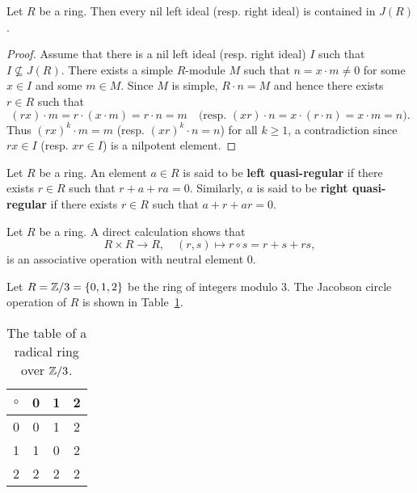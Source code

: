 \begin{proposition}
	\label{pro:nilJ}
	Let $R$ be a ring. Then every nil left ideal (resp. right ideal) is contained in $J(R)$.
\end{proposition}

\begin{proof}
	Assume that there is a nil left ideal (resp. right ideal) $I$ such that 
	$I\not\subseteq J(R)$. There exists a simple $R$-module $M$ such that 
	$n=x\cdot m\ne 0$ for some $x\in I$ and some $m\in M$. Since $M$ is simple,
	$R\cdot n=M$ and hence there exists $r\in R$ such that 
	\[
	(rx)\cdot m=r\cdot (x\cdot m)=r\cdot n=m\quad\text{(resp.
	$(xr)\cdot n=x\cdot (r\cdot n)=x\cdot m=n$).}
	\]
	Thus $(rx)^k\cdot m=m$ (resp. $(xr)^k\cdot n=n$) for all 
	$k\geq1$, a contradiction since $rx\in I$ (resp. $xr\in I$) is a nilpotent element. 
\end{proof}

\begin{definition}
Let $R$ be a ring. An element $a\in R$ is said to be 
\textbf{left quasi-regular} if there exists $r\in R$ such that $r+a+ra=0$. Similarly, 
$a$ is said to be \textbf{right quasi-regular} if there exists $r\in R$ such that $a+r+ar=0$. 
\end{definition}

Let $R$ be a ring. A direct calculation shows that
\[
R\times R\to R,
\quad
(r,s)\mapsto r\circ s=r+s+rs,
\]
is an associative operation with neutral element $0$.

\begin{example}
Let $R=\mathbb{Z}/3=\{0,1,2\}$ be the ring of integers modulo 3. 
The Jacobson circle 
operation of $R$ is shown in Table~\ref{tab:radical}.
\end{example}

	\begin{table}[bht]
  		\caption{The table of a radical ring over $\mathbb{Z}/3$.}
		\centering
		\begin{tabular}{c|ccc}
			$\circ$ & 0 & 1 & 2\tabularnewline
			\hline
			0 & 0 & 1 & 2\tabularnewline
			1 & 1 & 0 & 2\tabularnewline
			2 & 2 & 2 & 2\tabularnewline
		\end{tabular}
    \label{tab:radical}
 	\end{table}



